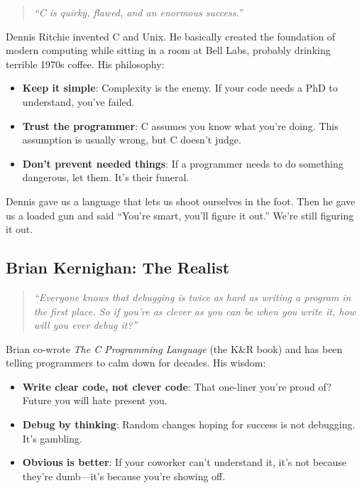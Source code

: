 \documentclass[10pt,openany]{book}
\begin{document}
\begin{quote}
\textit{``C is quirky, flawed, and an enormous success.''}
\end{quote}

Dennis Ritchie invented C and Unix. He basically created the foundation of modern computing while sitting in a room at Bell Labs, probably drinking terrible 1970s coffee. His philosophy:

\begin{itemize}
    \item \textbf{Keep it simple}: Complexity is the enemy. If your code needs a PhD to understand, you've failed.
    \item \textbf{Trust the programmer}: C assumes you know what you're doing. This assumption is usually wrong, but C doesn't judge.
    \item \textbf{Don't prevent needed things}: If a programmer needs to do something dangerous, let them. It's their funeral.
\end{itemize}

Dennis gave us a language that lets us shoot ourselves in the foot. Then he gave us a loaded gun and said ``You're smart, you'll figure it out.'' We're still figuring it out.

\subsection*{Brian Kernighan: The Realist}

\begin{quote}
\textit{``Everyone knows that debugging is twice as hard as writing a program in the first place. So if you're as clever as you can be when you write it, how will you ever debug it?''}
\end{quote}

Brian co-wrote \textit{The C Programming Language} (the K\&R book) and has been telling programmers to calm down for decades. His wisdom:

\begin{itemize}
    \item \textbf{Write clear code, not clever code}: That one-liner you're proud of? Future you will hate present you.
    \item \textbf{Debug by thinking}: Random changes hoping for success is not debugging. It's gambling.
    \item \textbf{Obvious is better}: If your coworker can't understand it, it's not because they're dumb---it's because you're showing off.
\end{itemize}
\end{document}
